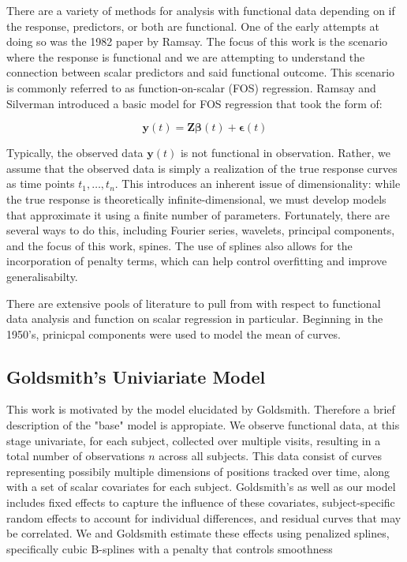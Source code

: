 \documentclass[AMA,Times1COL]{WileyNJDv5} %
\begin{document}
There are a variety of methods for analysis with functional data depending on if the response, predictors, or both are functional.  One of the early attempts at doing so was the 1982 paper by Ramsay\cite{ramsay_when_1982}.  The focus of this work is the scenario where the response is functional and we are attempting to understand the connection between scalar predictors and said functional outcome.  This scenario is commonly referred to as function-on-scalar (FOS) regression.  Ramsay and Silverman\cite{ramsay_functional_2005} introduced a basic model for FOS regression that took the form of:

\begin{equation}
    \boldsymbol{y}\left(t\right) = \boldsymbol{Z}\boldsymbol{\beta}\left(t\right) + \boldsymbol{\epsilon}\left(t\right)
\end{equation}

Typically, the observed data \(\boldsymbol{y}\left(t\right)\) is not functional in observation.  Rather, we assume that the observed data is simply a realization of the true response curves as time points \(t_1, \dots,t_n\)\cite{reiss_fast_2010}.  This introduces an inherent issue of dimensionality: while the true response is theoretically infinite-dimensional, we must develop models that approximate it using a finite number of parameters.  Fortunately, there are several ways to do this, including Fourier series, wavelets, principal components, and the focus of this work, spines\cite{morris_functional_2015}.  The use of splines also allows for the incorporation of penalty terms, which can help control overfitting and improve generalisabilty.

There are extensive pools of literature to pull from with respect to functional data analysis and function on scalar regression in particular.  Beginning in the 1950's, prinicpal components were used to model the mean of curves.  

\subsection{Goldsmith's Univiariate Model}
This work is motivated by the model elucidated by Goldsmith.  Therefore a brief description of the "base" model is appropiate.  We observe functional data, at this stage univariate, for each subject, collected over multiple visits, resulting in a total number of observations \(n\) across all subjects.  This data consist of curves representing possibily multiple dimensions of positions tracked over time, along with a set of scalar covariates for each subject.  Goldsmith's as well as our model includes fixed effects to capture the influence of these covariates, subject-specific random effects to account for individual differences, and residual curves that may be correlated.  We and Goldsmith estimate these effects using penalized splines, specifically cubic B-splines with a penalty that controls smoothness
\end{document}
